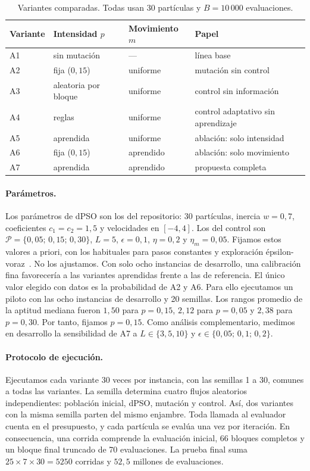 \documentclass[10pt,a4paper]{article}
\newcommand{\dc}{{,}}%
\begin{document}
\begin{table}[htb]
\centering\small
\caption{Variantes comparadas. Todas usan 30 partículas y $B=10\,000$ evaluaciones.}
\label{tab:met}
\begin{tabular}{@{}llll@{}}
\toprule
Variante & Intensidad $p$ & Movimiento $m$ & Papel \\
\midrule
A1 & sin mutación & --- & línea base \\
A2 & fija ($0\dc15$) & uniforme & mutación sin control \\
A3 & aleatoria por bloque & uniforme & control sin información \\
A4 & reglas & uniforme & control adaptativo sin aprendizaje \\
A5 & aprendida & uniforme & ablación: solo intensidad \\
A6 & fija ($0\dc15$) & aprendido & ablación: solo movimiento \\
A7 & aprendida & aprendido & propuesta completa \\
\bottomrule
\end{tabular}
\end{table}

\paragraph{Parámetros.}
Los parámetros de dPSO son los del repositorio: 30 partículas, inercia $w=0\dc7$, coeficientes
$c_1=c_2=1\dc5$ y velocidades en $[-4,4]$. Los del control son
$\mathcal{P}=\{0\dc05;\,0\dc15;\,0\dc30\}$, $L=5$, $\epsilon=0\dc1$, $\eta=0\dc2$ y
$\eta_m=0\dc05$. Fijamos estos valores a priori, con los habituales para pasos constantes y
exploración épsilon-voraz~\cite{sutton2018}. No los ajustamos. Con solo ocho instancias de
desarrollo, una calibración fina favorecería a las variantes aprendidas frente a las de
referencia. El único valor elegido con datos es la probabilidad de A2 y A6. Para ello
ejecutamos un piloto con las ocho instancias de desarrollo y 20 semillas. Los rangos promedio
de la aptitud mediana fueron $1\dc50$ para $p=0\dc15$, $2\dc12$ para $p=0\dc05$ y $2\dc38$ para
$p=0\dc30$. Por tanto, fijamos $p=0\dc15$. Como análisis complementario, medimos en desarrollo
la sensibilidad de A7 a $L\in\{3,5,10\}$ y $\epsilon\in\{0\dc05;\,0\dc1;\,0\dc2\}$.

\paragraph{Protocolo de ejecución.}
Ejecutamos cada variante 30 veces por instancia, con las semillas 1 a 30, comunes a todas las
variantes. La semilla determina cuatro flujos aleatorios independientes: población inicial,
dPSO, mutación y control. Así, dos variantes con la misma semilla parten del mismo enjambre.
Toda llamada al evaluador cuenta en el presupuesto, y cada partícula se evalúa una vez por
iteración. En consecuencia, una corrida comprende la evaluación inicial, 66 bloques completos y
un bloque final truncado de 70 evaluaciones. La prueba final suma $25\times7\times30=5250$
corridas y $52\dc5$ millones de evaluaciones.
\end{document}
